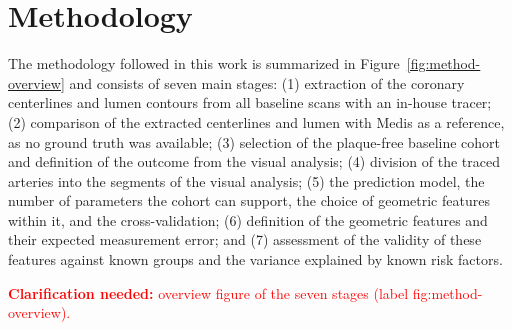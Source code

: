 \providecommand{\clarify}[1]{\textcolor{red}{\textbf{Clarification needed:} #1}}
\chapter{Methodology}
\label{ch:methodology}

The methodology followed in this work is summarized in Figure~\ref{fig:method-overview} and consists of seven main stages:
(1) extraction of the coronary centerlines and lumen contours from all baseline scans with an in-house tracer;
(2) comparison of the extracted centerlines and lumen with Medis as a reference, as no ground truth was available;
(3) selection of the plaque-free baseline cohort and definition of the outcome from the visual analysis;
(4) division of the traced arteries into the segments of the visual analysis;
(5) the prediction model, the number of parameters the cohort can support, the choice of geometric features within it, and the cross-validation;
(6) definition of the geometric features and their expected measurement error;
and (7) assessment of the validity of these features against known groups and the variance explained by known risk factors.

\clarify{overview figure of the seven stages (label fig:method-overview).}
